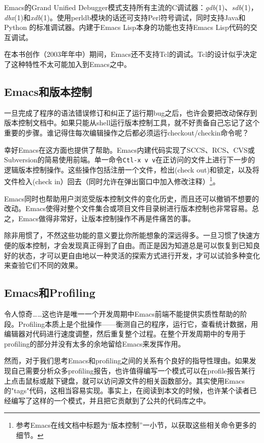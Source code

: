 \documentclass[12pt,oneside]{book}
\begin{document}
Emacs的Grand Unified Debugger模式支持所有主流的C调试器：\textit{gdb}(1)、\textit{sdb}(1)，\textit{dbx}(1)和\textit{xdb}(1)。使用perldb模块的话还可支持Perl符号调试，同时支持Java和Python
的标准调试器。内建于Emacs Lisp本身的功能也支持Emacs Lisp代码的交互调试。

在本书创作（2003年年中）期间，Emacs还不支持Tcl的调试。Tcl的设计似乎决定了这种特性不太可能加入到Emacs之中。

\subsection{Emacs和版本控制}
一旦完成了程序的语法错误修订和纠正了运行期bug之后，也许会要把改动保存到版本控制文档中。如果只能从shell运行版本控制工具，就不好责备自己忘记了这个重要的步骤。谁记得住每次编辑操作之后都必须运行checkout/checkin命令呢？

幸好Emacs在这方面也提供了帮助。Emacs内建代码实现了SCCS、RCS、CVS或Subversion的简易使用前端。单一命令\verb+Ctl-x v v+在正访问的文件上进行下一步的逻辑版本控制操作。这些操作包括注册一个文件，检出(check out)和锁定，以及将文件检入(check in）回去（同时允许在弹出窗口中加入修改注释）\footnote{参考Emacs在线文档中标题为“版本控制”一小节，以获取这些相关命令更多的细节。}。

Emacs同时也帮助用户浏览受版本控制文件的变化历史，而且还可以撤销不想要的改动。Emacs使得对整个文件集合或项目文件目录树进行版本控制也非常容易。总之，Emacs做得非常好，让版本控制操作不再是件痛苦的事。

除非用惯了，不然这些功能的意义要比你所能想象的深远得多。一旦习惯了快速方便的版本控制，才会发现真正得到了自由。而正是因为知道总是可以恢复到已知良好的状态，才可以更自由地以一种灵活的探索方式进行开发，才可以试验多种变化来查验它们不同的效果。

\subsection{Emacs和Profiling}
令人惊奇……这也许是唯一一个开发周期中Emacs前端不能提供实质性帮助的阶段。Profiling本质上是个批操作——衡测自己的程序，运行它，查看统计数据，用编辑器对代码进行速度调整，然后重复整个过程。在整个开发周期中的专用于profiling的部分并没有太多的余地留给Emacs来发挥作用。

然而，对于我们思考Emacs和profiling之间的关系有个良好的指导性理由。如果发现自己需要分析众多profiling报告，也许值得编写一个模式可以在profile报告某行上点击鼠标或敲下键盘，就可以访问源文件的相关函数部分。其实使用Emacs的"tags"代码，这相当容易实现。事实上，在阅读到本文的时候，也许某个读者已经编写了这样的一个模式，并且把它贡献到了公共的代码库之中。
\end{document}
